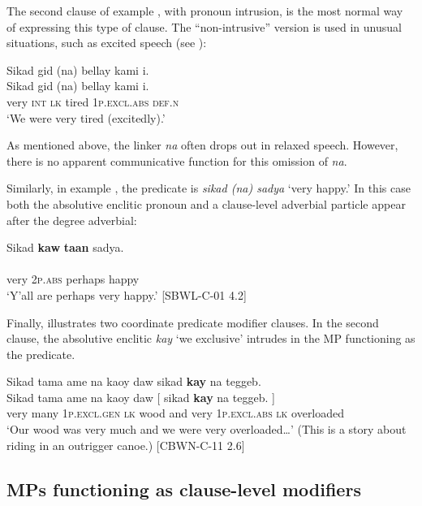 The second clause of example , with pronoun intrusion, is the most normal way of expressing this type of clause. The “non-intrusive” version is used in unusual situations, such as excited speech  (see ):

\ea
\label{bkm:Ref422836404}
Sikad  gid  (na)  bellay  kami  i. \\\smallskip
 \gll Sikad  gid  (na)  bellay  kami  i. \\
very  \textsc{int}  \textsc{lk} tired  1\textsc{p.excl.abs} \textsc{def.n} \\
\glt ‘We were very tired (excitedly).’
\z

As mentioned above, the linker \textit{na} often drops out in relaxed speech. However, there is no apparent communicative function for this omission of \textit{na}.

Similarly, in example , the predicate is \textit{sikad (na) sadya} ‘very happy.’ In this case both the absolutive enclitic pronoun and a clause-level adverbial particle appear after the degree adverbial:

\ea
\label{bkm:Ref418091931}
Sikad  \textbf{kaw}  \textbf{taan}  sadya. \\\smallskip
  \\
 {} very  2\textsc{p.abs} perhaps  happy {} \\
\glt ‘Y’all are perhaps very happy.’ [SBWL-C-01 4.2]
\z

Finally,  illustrates two coordinate predicate modifier clauses. In the second clause, the absolutive enclitic \textit{kay} ‘we exclusive’ intrudes in the MP functioning as the predicate.

\ea
\label{bkm:Ref418092305}
Sikad  tama  ame  na  kaoy  daw  sikad  \textbf{kay}  na  teggeb. \\\smallskip
 \gll Sikad  tama  ame  na  kaoy  daw  [ sikad  \textbf{kay}  na  teggeb.{ }] \\
very  many  1\textsc{p.excl.gen}  \textsc{lk}  wood  and {} very  1\textsc{p.excl.abs}  \textsc{lk}  overloaded \\
\glt ‘Our wood was very much and we were very overloaded…’ (This is a story about riding in an outrigger canoe.) [CBWN-C-11 2.6]
\z

\subsection{MPs functioning as clause-level modifiers}
\label{bkm:Ref418107822} \label{bkm:Ref439924168}

